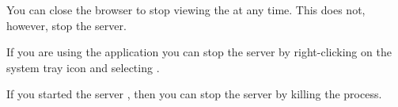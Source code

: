 You can close the browser to stop viewing the \dash{} at any time. This does not, however, stop the \dash{} server. 

If you are using the \dash{} application  you can stop the \dash{} server by right-clicking on the system tray icon and selecting . 

If you started the \dash{} server , then you can stop the \dash{} server by killing the process. 
